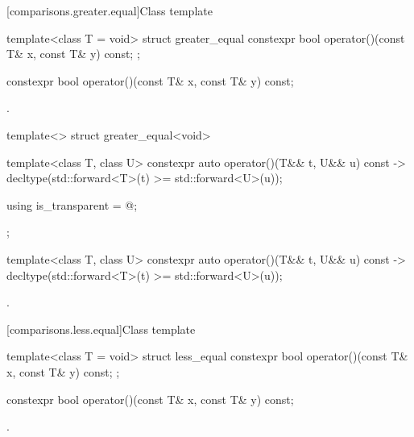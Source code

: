 [comparisons.greater.equal]{Class template }

%
\begin{itemdecl}
template<class T = void> struct greater_equal {
  constexpr bool operator()(const T& x, const T& y) const;
};
\end{itemdecl}

%
\begin{itemdecl}
constexpr bool operator()(const T& x, const T& y) const;
\end{itemdecl}

\begin{itemdescr}
\pnum
\returns
{}.
\end{itemdescr}

%
\begin{itemdecl}
template<> struct greater_equal<void> {
  template<class T, class U> constexpr auto operator()(T&& t, U&& u) const
    -> decltype(std::forward<T>(t) >= std::forward<U>(u));

  using is_transparent = @\unspec@;
};
\end{itemdecl}

%
\begin{itemdecl}
template<class T, class U> constexpr auto operator()(T&& t, U&& u) const
    -> decltype(std::forward<T>(t) >= std::forward<U>(u));
\end{itemdecl}

\begin{itemdescr}
\pnum
\returns
{}.
\end{itemdescr}

[comparisons.less.equal]{Class template }

%
\begin{itemdecl}
template<class T = void> struct less_equal {
  constexpr bool operator()(const T& x, const T& y) const;
};
\end{itemdecl}

%
\begin{itemdecl}
constexpr bool operator()(const T& x, const T& y) const;
\end{itemdecl}

\begin{itemdescr}
\pnum
\returns
{}.
\end{itemdescr}

